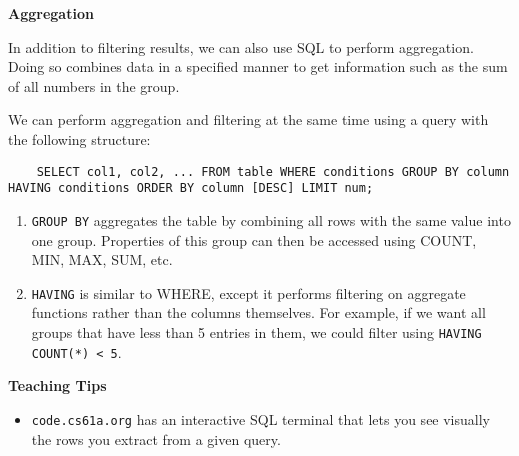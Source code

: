 \textbf{Aggregation}

In addition to filtering results, we can also use SQL to perform aggregation. Doing so combines data in a specified manner to get information such as the sum of all numbers in the group.

We can perform aggregation and filtering at the same time using a query with the following structure:
\begin{lstlisting}
    SELECT col1, col2, ... FROM table WHERE conditions GROUP BY column HAVING conditions ORDER BY column [DESC] LIMIT num;
\end{lstlisting}

\begin{enumerate}
    \item \texttt{GROUP BY} aggregates the table by combining all rows with the same value into one group. Properties of this group can then be accessed using COUNT, MIN, MAX, SUM, etc.
    \item \texttt{HAVING} is similar to WHERE, except it performs filtering on aggregate functions rather than the columns themselves. For example, if we want all groups that have less than 5 entries in them, we could filter using \texttt{HAVING COUNT(*) < 5}.
\end{enumerate}

\begin{guide}
\begin{blocksection}
\textbf{Teaching Tips}
\begin{itemize}
    \item \lstinline{code.cs61a.org} has an interactive SQL terminal that lets you see visually the rows you extract from a given query.
\end{itemize}
\end{blocksection}
\end{guide}